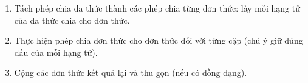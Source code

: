 \begin{enumerate}
\item Tách phép chia đa thức thành các phép chia từng đơn thức: lấy mỗi hạng tử của đa thức chia cho đơn thức.
\item Thực hiện phép chia đơn thức cho đơn thức đối với từng cặp (chú ý giữ đúng dấu của mỗi hạng tử).
\item Cộng các đơn thức kết quả lại và thu gọn (nếu có đồng dạng).
\end{enumerate}
